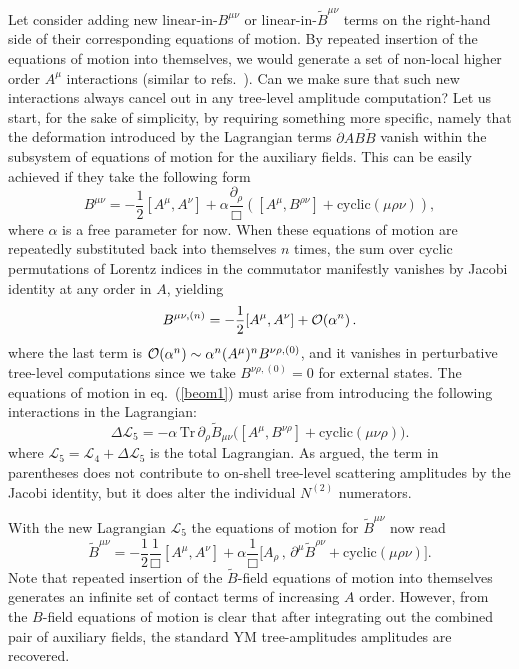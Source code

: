 \documentclass[11pt,a4paper]{article}
\def\eqn#1{eq.~(\ref{#1})}
\begin{document}
Let consider adding new linear-in-$B^{\mu \nu}$ or linear-in-$\tilde{B}^{\mu \nu}$ terms on the right-hand side of their corresponding equations of motion. By repeated insertion of the equations of motion into themselves, we would generate a set of non-local higher order $A^\mu$ interactions (similar to refs.~\cite{Bern:2010yg,Tolotti:2013caa}). Can we make sure that such new interactions always cancel out in any tree-level amplitude computation? Let us start, for the sake of simplicity, by requiring something more specific, namely that the deformation introduced by the Lagrangian terms $\partial AB \tilde{B}$ vanish within the subsystem of equations of motion for the auxiliary fields. This can be easily achieved if they take the following form
\begin{equation} \label{beom1}
    B^{\mu \nu} = -\frac{1}{2} [A^\mu,A^\nu] + \alpha \frac{\partial_\rho}{\Box} \left( [A^\mu , B^{\rho \nu}] + \text{cyclic}(\mu \rho \nu) \right),
\end{equation}
where $\alpha$ is a free parameter for now. When these equations of motion are repeatedly substituted back into themselves $n$ times, the sum over cyclic permutations of Lorentz indices in the commutator manifestly vanishes by Jacobi identity at any order in $A$, yielding
\begin{equation} \label{beom2}
    B^{\mu\nu,(n)} = -\frac{1}{2}[A^\mu,A^\nu] + {\cal O}(\alpha^n) \, .
\end{equation}
where the last term is ${\cal O}(\alpha^n) \sim \alpha^n (A^\mu)^{n} B^{\nu \rho,(0)}$, and it vanishes in perturbative tree-level computations since we take $B^{\nu \rho,(0)}=0$ for external states. 
The equations of motion in \eqn{beom1} must arise from introducing the following interactions in the Lagrangian:
\begin{equation}
\Delta \mathcal{L}_5 = - \alpha \, \text{Tr}  \,  \partial_\rho \tilde{B}_{\mu \nu} \Big( [A^\mu, B^{\nu \rho}] + \text{cyclic}(\mu \nu \rho) \Big) .
\end{equation}
where $ \mathcal{L}_5=  \mathcal{L}_4 + \Delta  \mathcal{L}_5 $ is the total Lagrangian. As argued, the term in parentheses does not contribute to on-shell tree-level scattering amplitudes by the Jacobi identity, but it does alter the individual $N^{(2)}$ numerators. 

With the new Lagrangian $ \mathcal{L}_5$ the equations of motion for $\tilde{B}^{\mu \nu}$ now read
\begin{equation}
 \tilde{B}^{\mu \nu} =   - \frac{1}{2}\frac{1}{\Box} [A^\mu, A^\nu] + \alpha\frac{1}{\Box} \big[A_\rho\,,\, \partial^\mu \tilde{B}^{\rho \nu} + \text{cyclic}(\mu \rho \nu)\big] .
 \end{equation}
Note that repeated insertion of the $\tilde{B}$-field equations of motion into themselves generates an infinite set of contact terms of increasing $A$ order. However, from the $B$-field equations of motion is clear that after integrating out the combined pair of auxiliary fields, the standard YM tree-amplitudes amplitudes are recovered. 
\end{document}

